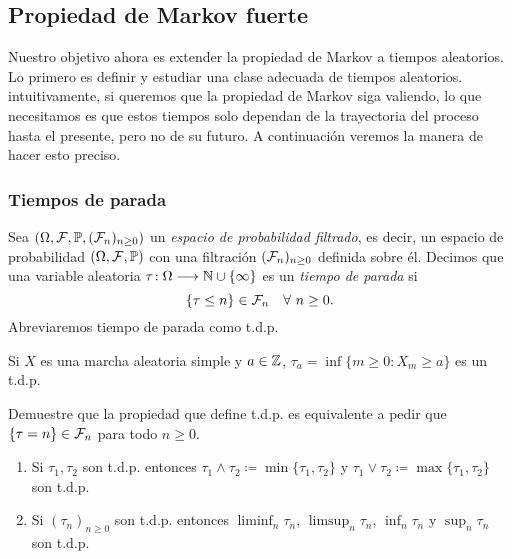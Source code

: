 \subsection{Propiedad de Markov fuerte}

Nuestro objetivo ahora es extender la propiedad de Markov a tiempos aleatorios.
Lo primero es definir y estudiar una clase adecuada de tiempos aleatorios.
intuitivamente, si queremos que la propiedad de Markov siga valiendo, lo que necesitamos es que estos tiempos solo dependan de la trayectoria del proceso hasta el presente, pero no de su futuro.
A continuación veremos la manera de hacer esto preciso.

\subsubsection{Tiempos de parada}

\begin{defn}
Sea $(\Omega,\mathcal{F},\mathbb{P},(\mathcal{F}_n)_{n\geq0})$ un \emph{espacio de probabilidad filtrado}, es decir, un espacio de probabilidad $(\Omega,\mathcal{F},\mathbb{P})$ con una filtración $(\mathcal{F}_n)_{n\geq0}$ definida sobre él.
Decimos que una variable aleatoria $\tau\!:\Omega\longrightarrow\mathbb{N}\cup\{\infty\}$ es un \emph{tiempo de parada} si
\[\{\tau\leq n\}\in\mathcal{F}_n\quad\forall~n\geq0.\]
Abreviaremos tiempo de parada como t.d.p.
\end{defn}

\begin{ex}\label{ex:taua}
Si $X$ es una marcha aleatoria simple y $a\in\mathbb{Z}$, $\tau_a=\inf\{m\geq0\!:X_m\geq a\}$ es un t.d.p.
\end{ex}

\begin{exer}
Demuestre que la propiedad que define t.d.p. es equivalente a pedir que $\{\tau=n\}\in\mathcal{F}_n$ para todo $n\geq0$.
\end{exer}

\begin{prop}%
\leavevmode
\begin{enumerate}[label=\uptext{(\arabic*)}]
\item Si $\tau_1,\tau_2$ son t.d.p. entonces $\tau_1\wedge\tau_2\coloneqq\min\{\tau_1,\tau_2\}$ y $\tau_1\vee\tau_2\coloneqq\max\{\tau_1,\tau_2\}$ son t.d.p.
\item Si $(\tau_n)_{n\geq0}$ son t.d.p. entonces $\liminf_n\tau_n$, $\limsup_n\tau_n$, $\inf_n\tau_n$ y $\sup_n\tau_n$ son t.d.p.
\end{enumerate}
\end{prop}


